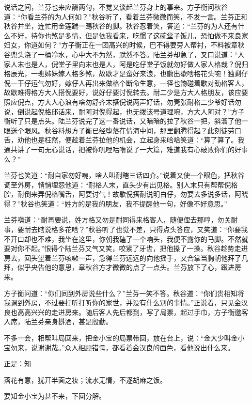 \documentclass[12pt,UTF8]{ctexbook}
\begin{document}
{{{说话之间，兰芬也来应酬两句，不觉又谈起兰芬身上的事来。方子衡问秋谷道：“你看兰芬的为人何如？”秋谷听了，看着兰芬微微而笑，不发一言。兰芬正和秋谷并坐，连忙用金莲踹一踢秋谷的脚。秋谷忍着笑，答道：“兰芬的为人还有什么不好，待你也煞是多情，但是依我看来，吃惯了这碗堂子饭儿，恐怕做不来良家妇女，你道如何？”方子衡正在一团高兴的时候，巴不得要旁人帮衬，不料被章秋谷兜头浇了一桶冷水，心中大不为然，默然不答。陆兰芬却急了，叉口说道：“人家人末也是人，倪堂子里向末也是人，阿是吃仔堂子饭就勿好做人家人格哉？倪归格辰光，一班姊妹嫁人格多煞，故歇才是蛮好来浪，也朆出歇啥格花头啘！独剩仔倪一干仔运气勿好，嫁仔人再出来做格个断命生意，一径也朆碰着歇对劲格客人，故歇难得格方大人搭倪要好，说好仔要讨倪转去。耐二少是方大人格朋友，该应要照应倪点，方大人心浪有啥勿舒齐末搭倪说两声好话，勿壳张耐格二少爷好话勿说，倒说起倪格邱话来，耐阿对倪得起，也无拨该号道理啘，方大人阿对？”方子衡听了只是点头。陆兰芬说完了这一番说话，又暗暗的拉了秋谷一把，斜溜了他一眼送个眼风。秋谷料想方子衡已经堕落在情海中间，那里翻腾得起？此刻徒劳口舌，劝他也是枉然，便趁着兰芬拉他的机会，立起身来哈哈笑道：“算了算了。我通共讲了一句无心说话，把被你叽哩咕噜说了一大篇，难道我有心破败你们的好事么？”

兰芬也笑道：“耐自家勿好啘，啥人叫耐瞎三话四介。”说着又使一个眼色，把秋谷调至外房，悄悄埋怨他道：“耐格人末，直头少有出见格。别人末只有帮帮倪格腔，耐倒来弄倪格嘴舌，阿要讨气！故歇倪搭耐说明白仔，勿要去多说多话，阿晓得？”秋谷也笑道：“姓方的是我的朋友，我不提醒他一句，好像不好意思。”

兰芬嗔道：“耐再要说，姓方格又勿是耐同得来格客人，随便俚去那哼，勿关耐事，要耐去瞎说格多花啥？”秋谷听了也觉不差，只得点头答应，又笑道：“你要我不开口却也不难，我坐在这里，你朝我磕了一个响头，我便不露你的马脚。不然就要对你不起。”恨得个陆兰芬又气又笑，咬紧了牙齿，把他搡了一搡。秋谷趁势走进房去，回头望着兰芬咳嗽一声，急得兰芬远远的向他摇手，又合掌当胸朝他拜了几拜，似乎央告他的意思，章秋谷方才微微的点了一点头。兰芬放下了心，跟进房来。

方子衡问道：“你们同到外房说些什么？”兰芬一笑不答。秋谷道：“你们贵相知将我调到外房，不过要打听打听你的家世，并没有什么别的事情。”正说着，只见金汉良也高高兴兴的走进房来。随后客人先后都到，写了局票，起过手巾，方子衡邀客入席，陆兰芬亲身斟酒，甚是殷勤。

不多一会，相帮叫局回来，把金小宝的局票带回，放在台上，说：“金大少叫金小宝勿来，说谢谢哉。”众人相顾错愕，都看着金汉良的面色，看他说出什么来。

正是：知

落花有意，犹开半面之妆；流水无情，不逐胡麻之饭。

要知金小宝为甚不来，下回分解。





}}}
\end{document}
